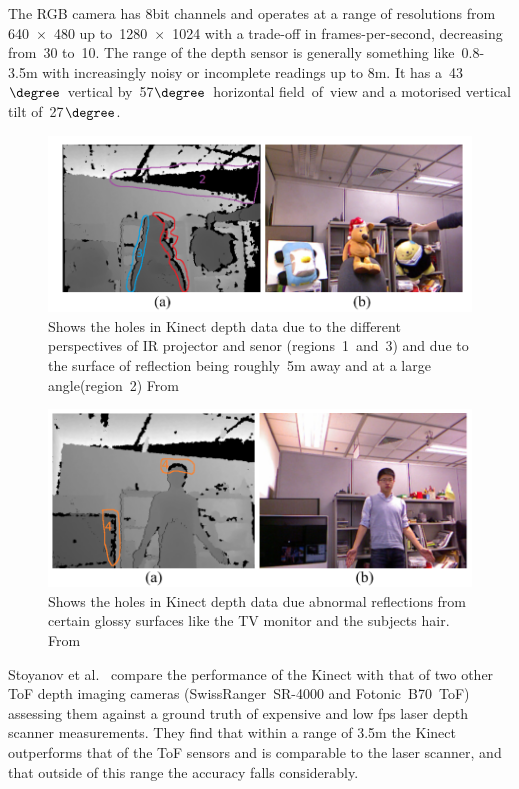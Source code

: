 \documentclass[11pt]{article} %
\begin{document}
The RGB camera has 8bit channels and operates at a range of resolutions from 640~$\times$~480 up to~1280~$\times$~1024 with a trade-off in frames-per-second, decreasing from~30 to~10. The range of the depth sensor is generally something like~0.8-3.5m with increasingly noisy or incomplete readings up to 8m. It has a~43$\degree$~vertical by~57$\degree$~horizontal field~of~view and a motorised vertical tilt of~27$\degree$.\cite{Han2013}
 \begin{figure}
\includegraphics*[width=1\linewidth,clip]{kinectHoles4}
\caption{Shows the holes in Kinect depth data due to the different perspectives of IR projector and senor (regions~1~and~3) and due to the surface of reflection being roughly~5m away and at a large angle(region~2) From~\cite{Feng2013}		\label{fig:kinectHoles4}  } 
\end{figure}
 \begin{figure}
\includegraphics*[width=1\linewidth,clip]{kinectHoles3}
\caption{Shows the holes in Kinect depth data due abnormal reflections from certain glossy surfaces like the TV monitor and the subjects hair.  From~\cite{Feng2013}			\label{fig:kinectHoles3}  } 
\end{figure}

Stoyanov et al.~\cite{StoyanovTodorandLouloudiAthanasiaandAndreassonHenrikandLilienthal2011a} compare the performance of the Kinect with that of two other ToF depth imaging cameras (SwissRanger~SR-4000 and Fotonic~B70~ToF) assessing them against a ground truth of expensive and low fps laser depth scanner measurements. They find that within a range of 3.5m the Kinect outperforms that of the ToF sensors and is comparable to the laser scanner, and that outside of this range the accuracy falls considerably.
\end{document}
